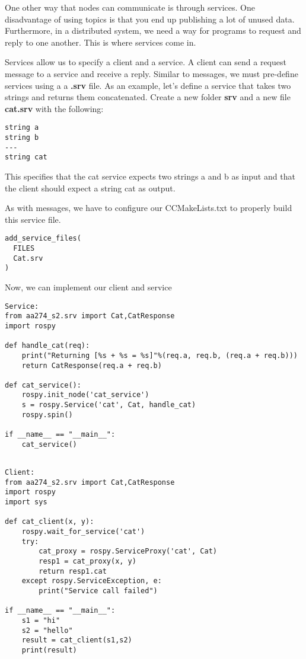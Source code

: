 One other way that nodes can communicate is through services. One disadvantage of using topics is that you end up publishing a lot of unused data. Furthermore, in a distributed system, we need a way for programs to request and reply to one another. This is where services come in. 

Services allow us to specify a client and a service. A client can send a request message to a service and receive a reply. Similar to messages, we must pre-define services using a a \textbf{.srv} file. As an example, let's define a service that takes two strings and returns them concatenated. Create a new folder \textbf{srv} and a new file \textbf{cat.srv} with the following:

\begin{lstlisting}
string a
string b
---
string cat
\end{lstlisting}

This specifies that the cat service expects two strings a and b as input and that the client should expect a string cat as output. 

As with messages, we have to configure our CCMakeLists.txt to properly build this service file. 

\begin{lstlisting}
add_service_files(
  FILES
  Cat.srv
)
\end{lstlisting}



Now, we can implement our client and service 

\begin{lstlisting}
Service:
from aa274_s2.srv import Cat,CatResponse
import rospy

def handle_cat(req):
    print("Returning [%s + %s = %s]"%(req.a, req.b, (req.a + req.b)))
    return CatResponse(req.a + req.b)

def cat_service():
    rospy.init_node('cat_service')
    s = rospy.Service('cat', Cat, handle_cat)
    rospy.spin()

if __name__ == "__main__":
    cat_service()
 
 \end{lstlisting}


\begin{lstlisting}
Client:
from aa274_s2.srv import Cat,CatResponse
import rospy
import sys

def cat_client(x, y):
    rospy.wait_for_service('cat')
    try:
        cat_proxy = rospy.ServiceProxy('cat', Cat)
        resp1 = cat_proxy(x, y)
        return resp1.cat
    except rospy.ServiceException, e:
        print("Service call failed")

if __name__ == "__main__":
	s1 = "hi"
	s2 = "hello"
	result = cat_client(s1,s2)
	print(result)
 \end{lstlisting}

